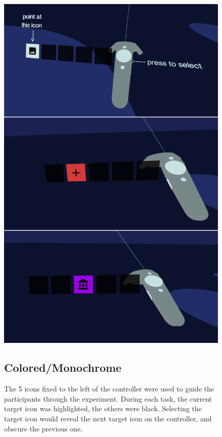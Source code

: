 \documentclass{tufte-book} %
\begin{document}
\begin{figure}
\begin{marginfigure}
  \includegraphics[width=\linewidth]{controllers.png}
  \caption{The 5 icons fixed to the left of the controller were used to guide the participants through the experiment. During each task, the current target icon was highlighted, the others were black. Selecting the target icon would reveal the next target icon on the controller, and obscure the previous one.}
  \label{fig:controllers}
\end{marginfigure}

\subsection{Colored/Monochrome}


\end{figure}
\end{document}
